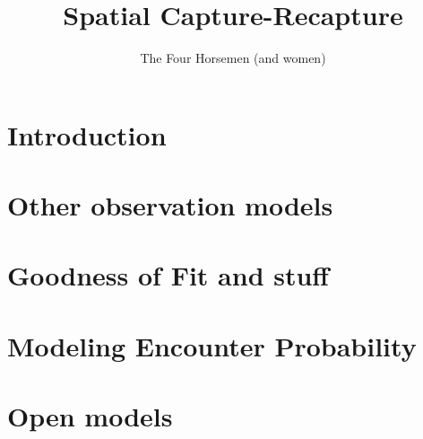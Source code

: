 \documentclass{book}
\begin{document}
\title{ Spatial Capture-Recapture  }
\subtitle{
}
\author{The Four Horsemen (and women) }

\address{
USGS Patuxent Wildlife Research Center \\
North Carolina State University
}

\maketitle

\newpage

\setcounter{tocdepth}{2}
\tableofcontents

\chapter{Introduction}
\label{chapt.intro}







\chapter{Other observation models}
\label{chapt.poisson}

%





\chapter{Goodness of Fit and stuff}
\label{chapt.gof}

\chapter{Modeling Encounter Probability}
\label{chapt.covariates}






\chapter{Open models}
\label{chapt.open}
















\end{document}
